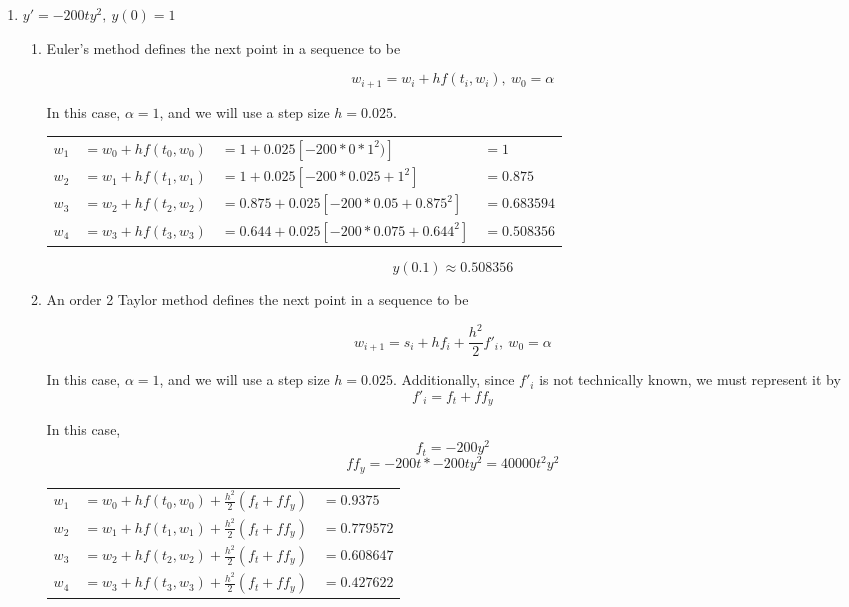 \documentclass[11pt]{article}
\begin{document}
\begin{enumerate}
\begin{enumerate}
\begin{enumerate}
\begin{itemize}
				\medskip

			\end{itemize}

		\end{enumerate}

		\item $y' = -200ty^2,\ y(0) = 1$

		\begin{enumerate}

			\item Euler's method defines the next point in a sequence to be

			\[
			w_{i+1} = w_i + hf(t_i,w_i),\ w_0 = \alpha
			\]

			In this case, $\alpha = 1$, and we will use a step size $h=0.025$.

			\medskip

			\begin{tabular}{llll}

			$w_1$ & $= w_0 + hf(t_0,w_0)$ & $= 1 + 0.025[-200*0*1^2)]$ &$=1$ \\
			$w_2$ & $= w_1 + hf(t_1,w_1)$ & $= 1 + 0.025[-200 * 0.025 + 1^2]$ & $=0.875$ \\
			$w_3$ & $= w_2 + hf(t_2,w_2)$ & $= 0.875 + 0.025[-200 * 0.05 + 0.875^2]$ & $=0.683594$ \\
			$w_4$ & $= w_3 + hf(t_3,w_3)$ & $= 0.644 + 0.025[-200*0.075 + 0.644^2]$ & $=0.508356$ \\

			\end{tabular}

			\[y(0.1) \approx 0.508356\]

			\medskip

			\item An order 2 Taylor method defines the next point in a sequence to be

			\[
			w_{i+1} = s_i + hf_i + \frac{h^2}{2}f'_i,\ w_0 = \alpha
			\]

			In this case, $\alpha = 1$, and we will use a step size $h=0.025$. Additionally, since $f'_i$ is not technically known, we must represent it by
			\[
			f'_i = f_t + ff_y
			\]

			In this case,
			\[f_t = -200y^2\]
			\[ff_y = -200t * -200ty^2 = 40000t^2y^2\]

			\medskip

			\begin{tabular}{lll}

			$w_1$ & $= w_0 + hf(t_0,w_0) + \frac{h^2}{2}(f_t+ff_y)$ & $= 0.9375$ \\
			$w_2$ & $= w_1 + hf(t_1,w_1) + \frac{h^2}{2}(f_t+ff_y)$ & $= 0.779572$ \\
			$w_3$ & $= w_2 + hf(t_2,w_2) + \frac{h^2}{2}(f_t+ff_y)$ & $= 0.608647$ \\
			$w_4$ & $= w_3 + hf(t_3,w_3) + \frac{h^2}{2}(f_t+ff_y)$ & $= 0.427622$


\end{tabular}
\end{enumerate}
\end{enumerate}
\end{enumerate}
\end{document}
